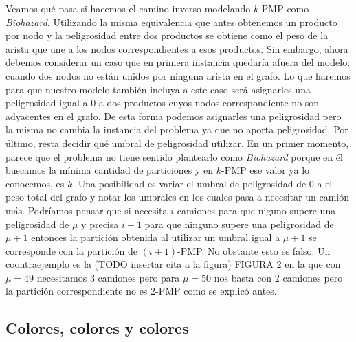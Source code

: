 Veamos qué pasa si hacemos el camino inverso modelando $k$-PMP como \emph{Biohazard}. Utilizando la misma equivalencia que antes obtenemos
un producto por nodo y la peligrosidad entre dos productos se obtiene como el peso de la arista que une a los nodos correspondientes a esos
productos. Sin embargo, ahora debemos considerar un caso que en primera instancia quedaría afuera del modelo: cuando dos nodos no están unidos 
por ninguna arista en el grafo. Lo que haremos para que nuestro modelo también incluya a este caso será asignarles una peligrosidad igual a 0 
a dos productos cuyos nodos correspondiente no son adyacentes en el grafo. De esta forma podemos asignarles una peligrosidad pero la misma no 
cambia la instancia del problema ya que no aporta peligrosidad. Por último, resta decidir qué umbral de peligrosidad utilizar. En un primer 
momento, parece que el problema no tiene sentido plantearlo como \emph{Biohazard} porque en él buscamos la mínima cantidad de particiones y 
en $k$-PMP ese valor ya lo conocemos, es $k$. Una posibilidad es variar el umbral de peligrosidad de 0 a el peso total del grafo y notar 
los umbrales en los cuales pasa a necesitar un camión más. Podríamos pensar que si necesita $i$ camiones para que niguno supere una peligrosidad
de $\mu$ y precisa $i+1$ para que ninguno supere una peligrosidad de $\mu + 1$ entonces la partición obtenida al utilizar un umbral igual a
$\mu + 1$ se corresponde con la partición de $(i+1)$-PMP. No obstante esto es falso. Un coontraejemplo es la (TODO insertar cita a la figura) FIGURA 2
en la que con $\mu = 49$ necesitamos 3 camiones pero para $\mu = 50$ nos basta con 2 camiones pero la partición correspondiente no es 2-PMP como se
explicó antes.

\subsection{Colores, colores y colores}

